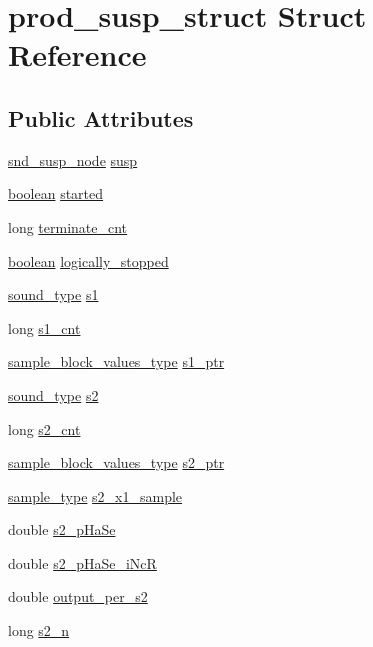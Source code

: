 \hypertarget{structprod__susp__struct}{}\section{prod\+\_\+susp\+\_\+struct Struct Reference}
\label{structprod__susp__struct}
\subsection*{Public Attributes}
\begin{DoxyCompactItemize}
\item 
\hyperlink{sound_8h_a6b268203688a934bd798ceb55f85d4c0}{snd\+\_\+susp\+\_\+node} \hyperlink{structprod__susp__struct_aef3403cd683e54e58efc0b5b5ce17809}{susp}
\item 
\hyperlink{cext_8h_a7670a4e8a07d9ebb00411948b0bbf86d}{boolean} \hyperlink{structprod__susp__struct_aa051245a260de92fd7817bc26e53e4eb}{started}
\item 
long \hyperlink{structprod__susp__struct_a43f7459a50973cbf04033baf234ee9c3}{terminate\+\_\+cnt}
\item 
\hyperlink{cext_8h_a7670a4e8a07d9ebb00411948b0bbf86d}{boolean} \hyperlink{structprod__susp__struct_a54c52685c2f6852c4dd963b1a5d5f81e}{logically\+\_\+stopped}
\item 
\hyperlink{sound_8h_a792cec4ed9d6d636d342d9365ba265ea}{sound\+\_\+type} \hyperlink{structprod__susp__struct_a186ffdbfce891fca1fc1a48c44801c03}{s1}
\item 
long \hyperlink{structprod__susp__struct_a7d2a3ceb8d128bdead09d6788e34ad85}{s1\+\_\+cnt}
\item 
\hyperlink{sound_8h_a83d17f7b465d1591f27cd28fc5eb8a03}{sample\+\_\+block\+\_\+values\+\_\+type} \hyperlink{structprod__susp__struct_a466b0db6723f203ec224ef9b4feabf7a}{s1\+\_\+ptr}
\item 
\hyperlink{sound_8h_a792cec4ed9d6d636d342d9365ba265ea}{sound\+\_\+type} \hyperlink{structprod__susp__struct_ac1a8cc77ec908d22cf176cf813aa209c}{s2}
\item 
long \hyperlink{structprod__susp__struct_a68146ef0285a3e2aac46436c3f326d56}{s2\+\_\+cnt}
\item 
\hyperlink{sound_8h_a83d17f7b465d1591f27cd28fc5eb8a03}{sample\+\_\+block\+\_\+values\+\_\+type} \hyperlink{structprod__susp__struct_aba5de3bf9bafb77b85065773fd58120b}{s2\+\_\+ptr}
\item 
\hyperlink{sound_8h_a3a9d1d4a1c153390d2401a6e9f71b32c}{sample\+\_\+type} \hyperlink{structprod__susp__struct_a1cb0bdabf3ff33e5ab739a45f1b6d353}{s2\+\_\+x1\+\_\+sample}
\item 
double \hyperlink{structprod__susp__struct_a37557ab3d835ea03681c607ea8570c46}{s2\+\_\+p\+Ha\+Se}
\item 
double \hyperlink{structprod__susp__struct_ab30a3855a3635e0710473565d2cc2484}{s2\+\_\+p\+Ha\+Se\+\_\+i\+NcR}
\item 
double \hyperlink{structprod__susp__struct_a0a31dd9b54024c13682b75b12455a1f6}{output\+\_\+per\+\_\+s2}
\item 
long \hyperlink{structprod__susp__struct_ad9f6031e699420211621706e0d3d7e42}{s2\+\_\+n}
\end{DoxyCompactItemize}


